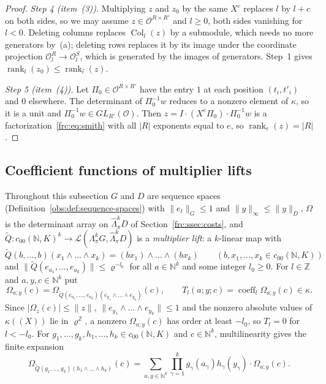 \documentclass[11pt]{amsart}
\theoremstyle{definition}
\theoremstyle{remark}
\numberwithin{equation}{section}
\newcommand{\N}{\mathbb N}
\newcommand{\Z}{\mathbb Z}
\newcommand{\cL}{\mathcal L}
\newcommand{\abs}[1]{\lvert #1\rvert}
\newcommand{\norm}[1]{\lVert #1\rVert}
\newcommand{\coeff}{\operatorname{coeff}}
\newcommand{\rank}{\operatorname{rank}}
\theoremstyle{plain}
\theoremstyle{definition}
\theoremstyle{plain}
\begin{document}
\begin{proof}
\emph{Step 4 (item~(3)).} Multiplying $z$ and $z_0$ by the same $X^c$ replaces $l$ by $l+c$ on both sides, so we may
assume $z\in\mathcal O^{R\times R'}$ and $l\ge0$, both sides vanishing for $l<0$. Deleting columns replaces
$\operatorname{Col}_l(z)$ by a submodule, which needs no more generators by~(a); deleting rows replaces it by its image
under the coordinate projection $\mathcal O_l^R\to\mathcal O_l^S$, which is generated by the images of generators. Step~1 gives $\rank_l(z_0)\le\rank_l(z)$.

\emph{Step 5 (item~(4)).} Let $\Pi_0\in\mathcal O^{R\times R'}$ have the entry $1$ at each position $(t_i,t'_i)$ and $0$
elsewhere. The determinant of $\Pi_0^{-1}w$ reduces to a nonzero element of $\kappa$, so it is a unit and
$\Pi_0^{-1}w\in GL_{R'}(\mathcal O)$. Then $z=I\cdot(X^e\Pi_0)\cdot\Pi_0^{-1}w$ is a factorization~\eqref{frc:eq:smith}
with all $\abs R$ exponents equal to $e$, so $\rank_e(z)=\abs R$.
\end{proof}

\subsection{Coefficient functions of multiplier lifts}\label{frc:ssec:coefficients}
Throughout this subsection $G$ and $D$ are sequence spaces (Definition~\ref{obs:def:sequence-spaces}) with
$\norm{e_t}_G\le1$ and $\norm y_\infty\le\norm y_D$, $\Omega$ is the determinant array on $\widehat\Lambda^k_\pi D$ of
Section~\ref{frc:ssec:costs}, and $\widetilde Q\colon c_{00}(\N,K)^k\to\cL(\Lambda^k_\pi G,\widehat\Lambda^k_\pi D)$ is a
\emph{multiplier lift}: a $k$\nobreakdash-linear map with
\begin{equation}\label{frc:eq:multiplier-lift}
 \widetilde Q(b,\dots,b)(x_1\wedge\dots\wedge x_k)=(bx_1)\wedge\dots\wedge(bx_k)\qquad(b,x_1,\dots,x_k\in c_{00}(\N,K))
\end{equation}
and $\norm{\widetilde Q(e_{a_1},\dots,e_{a_k})}\le\varrho^{-l_0}$ for all $a\in\N^k$ and some integer $l_0\ge0$. For
$l\in\Z$ and $a,y,c\in\N^k$ put
\[
 \Omega_{a;y}(c)=\Omega_{\widetilde Q(e_{a_1},\dots,e_{a_k})(e_{y_1}\wedge\dots\wedge e_{y_k})}(c),\qquad
 T_l(a;y;c)=\coeff_l\Omega_{a;y}(c)\in\kappa .
\]
Since $\abs{\Omega_z(c)}\le\norm z$, $\norm{e_{y_1}\wedge\dots\wedge e_{y_k}}\le1$ and the nonzero absolute values of
$\kappa((X))$ lie in $\varrho^\Z$, a nonzero $\Omega_{a;y}(c)$ has order at least $-l_0$, so $T_l=0$ for $l<-l_0$. For
$g_1,\dots,g_k,h_1,\dots,h_k\in c_{00}(\N,K)$ and $c\in\N^k$, multilinearity gives the finite expansion
\begin{equation}\label{frc:eq:expand}
 \Omega_{\widetilde Q(g_1,\dots,g_k)(h_1\wedge\dots\wedge h_k)}(c)=\sum_{a,y\in\N^k}\prod_{\gamma=1}^kg_\gamma(a_\gamma)
 h_\gamma(y_\gamma)\cdot\Omega_{a;y}(c).
\end{equation}
\end{document}
